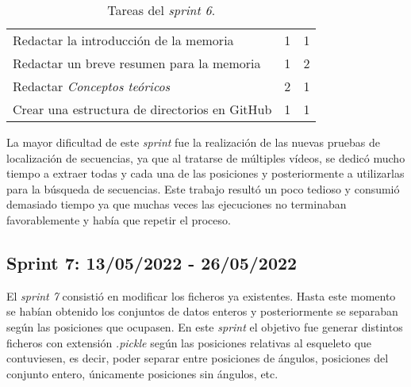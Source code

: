 \begin{table}[H]
{\begin{tabular}{p{10cm}cc}
\rowcolor[HTML]{ECF4FF} 
Redactar la introducción de la memoria                                             & 1                                                         & 1                                                          \\
\rowcolor[HTML]{EFEFEF} 
Redactar un breve resumen para la memoria                                          & 1                                                         & 2                                                          \\
\rowcolor[HTML]{ECF4FF} 
Redactar \textit{Conceptos teóricos}                                   & 2                                                         & 1                                                          \\
\rowcolor[HTML]{EFEFEF} 
Crear una estructura de directorios en GitHub                                      & 1                                                         & 1                                                          \\ \hline

\end{tabular}
}
\caption{Tareas del \textit{sprint 6}.}
\label{sprint6}
\end{table}

La mayor dificultad de este \textit{sprint} fue la realización de las nuevas pruebas de localización de secuencias, ya que al tratarse de múltiples vídeos, se dedicó mucho tiempo a extraer todas y cada una de las posiciones y posteriormente a utilizarlas para la búsqueda de secuencias. 
Este trabajo resultó un poco tedioso y consumió demasiado tiempo ya que muchas veces las ejecuciones no terminaban favorablemente y había que repetir el proceso.


\subsection{Sprint 7: 13/05/2022 - 26/05/2022}

El \textit{sprint 7} consistió en modificar los ficheros ya existentes. Hasta este momento se habían obtenido los conjuntos de datos enteros y posteriormente se separaban según las posiciones que ocupasen. En este \textit{sprint} el objetivo fue generar distintos ficheros con extensión \textit{.pickle} según las posiciones relativas al esqueleto que contuviesen, es decir, poder separar entre posiciones de ángulos, posiciones del conjunto entero, únicamente posiciones sin ángulos, etc.

